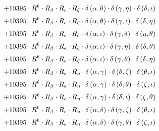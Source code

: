 \begin{subequations}
\begin{gather}
 \\[0.2em] \notag 		 + 10395 \cdot R^{6} \cdot R_{\beta{}} \cdot R_{\epsilon{}} \cdot R_{\zeta{}} \cdot \delta{}\left(\alpha{}, \theta{}\right) \cdot \delta{}\left(\gamma{}, \eta{}\right) \cdot \delta{}\left(\delta{}, \iota{}\right) 
 \\[0.2em] \notag 		 + 10395 \cdot R^{6} \cdot R_{\beta{}} \cdot R_{\epsilon{}} \cdot R_{\zeta{}} \cdot \delta{}\left(\alpha{}, \theta{}\right) \cdot \delta{}\left(\gamma{}, \iota{}\right) \cdot \delta{}\left(\delta{}, \eta{}\right) 
 \\[0.2em] \notag 		 + 10395 \cdot R^{6} \cdot R_{\beta{}} \cdot R_{\epsilon{}} \cdot R_{\zeta{}} \cdot \delta{}\left(\alpha{}, \iota{}\right) \cdot \delta{}\left(\gamma{}, \delta{}\right) \cdot \delta{}\left(\eta{}, \theta{}\right) 
 \\[0.2em] \notag 		 + 10395 \cdot R^{6} \cdot R_{\beta{}} \cdot R_{\epsilon{}} \cdot R_{\zeta{}} \cdot \delta{}\left(\alpha{}, \iota{}\right) \cdot \delta{}\left(\gamma{}, \eta{}\right) \cdot \delta{}\left(\delta{}, \theta{}\right) 
 \\[0.2em] \notag 		 + 10395 \cdot R^{6} \cdot R_{\beta{}} \cdot R_{\epsilon{}} \cdot R_{\zeta{}} \cdot \delta{}\left(\alpha{}, \iota{}\right) \cdot \delta{}\left(\gamma{}, \theta{}\right) \cdot \delta{}\left(\delta{}, \eta{}\right) 
 \\[0.2em] \notag 		 + 10395 \cdot R^{6} \cdot R_{\beta{}} \cdot R_{\epsilon{}} \cdot R_{\eta{}} \cdot \delta{}\left(\alpha{}, \gamma{}\right) \cdot \delta{}\left(\delta{}, \zeta{}\right) \cdot \delta{}\left(\theta{}, \iota{}\right) 
 \\[0.2em] \notag 		 + 10395 \cdot R^{6} \cdot R_{\beta{}} \cdot R_{\epsilon{}} \cdot R_{\eta{}} \cdot \delta{}\left(\alpha{}, \gamma{}\right) \cdot \delta{}\left(\delta{}, \theta{}\right) \cdot \delta{}\left(\zeta{}, \iota{}\right) 
 \\[0.2em] \notag 		 + 10395 \cdot R^{6} \cdot R_{\beta{}} \cdot R_{\epsilon{}} \cdot R_{\eta{}} \cdot \delta{}\left(\alpha{}, \gamma{}\right) \cdot \delta{}\left(\delta{}, \iota{}\right) \cdot \delta{}\left(\zeta{}, \theta{}\right) 
 \\[0.2em] \notag 		 + 10395 \cdot R^{6} \cdot R_{\beta{}} \cdot R_{\epsilon{}} \cdot R_{\eta{}} \cdot \delta{}\left(\alpha{}, \delta{}\right) \cdot \delta{}\left(\gamma{}, \zeta{}\right) \cdot \delta{}\left(\theta{}, \iota{}\right) 
 \\[0.2em] \notag 		 + 10395 \cdot R^{6} \cdot R_{\beta{}} \cdot R_{\epsilon{}} \cdot R_{\eta{}} \cdot \delta{}\left(\alpha{}, \delta{}\right) \cdot \delta{}\left(\gamma{}, \theta{}\right) \cdot \delta{}\left(\zeta{}, \iota{}\right) 

\end{gather}
\end{subequations}
